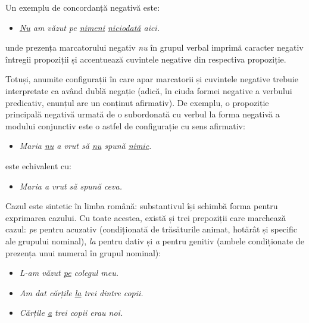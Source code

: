 \begin{multicols}{2}
Un exemplu de concordanță negativă este:

\begin{itemize}
\item\textit{\underline{Nu} am văzut pe \underline{nimeni} \underline{niciodată} aici.}
\end{itemize}

unde prezența marcatorului negativ \textit{nu} în grupul verbal imprimă caracter negativ întregii propoziții și accentuează cuvintele negative din respectiva propoziție. 

Totuși, anumite configurații în care apar marcatorii și cuvintele negative trebuie interpretate ca având dublă negație (adică, în ciuda formei negative a verbului predicativ, enunțul are un conținut afirmativ). De exemplu, o propoziție principală negativă urmată de o subordonată cu verbul la forma negativă a modului conjunctiv este o astfel de configurație cu sens afirmativ:

\begin{itemize}
\item\textit{Maria \underline{nu} a vrut să \underline{nu} spună \underline{nimic}.}
\end{itemize}

este echivalent cu:

\begin{itemize}
\item\textit{Maria a vrut să spună ceva.}
\end{itemize}

Cazul este sintetic în limba română: substantivul își schimbă forma pentru exprimarea cazului. Cu toate acestea, există și trei prepoziții care marchează cazul: \textit{pe} pentru acuzativ (condiționată de trăsăturile animat, hotărât și specific ale grupului nominal), \textit{la} pentru dativ și \textit{a} pentru genitiv (ambele condiționate de prezența unui numeral în grupul nominal):

\begin{itemize}
\item \textit{L-am văzut \underline{pe} colegul meu.}
\item \textit{Am dat cărțile \underline{la} trei dintre copii.}
\item \textit{Cărțile \underline{a} trei copii erau noi.}
\end{itemize}



\end{multicols}
